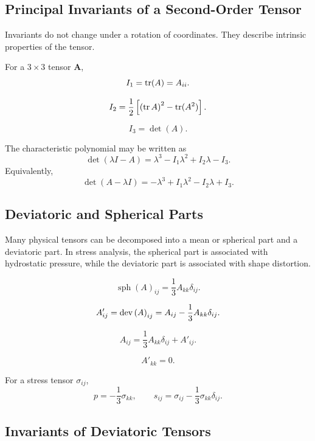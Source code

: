 \documentclass{otscience}
\begin{document}
\subsection{Principal Invariants of a Second-Order Tensor}

Invariants do not change under a rotation of coordinates. They describe intrinsic properties of the tensor.

\begin{formulaboxnosplit}
    For a \(3\times3\) tensor \(\mathbf{A}\),
    \[
        I_1=\operatorname{tr}(A)=A_{ii}.
    \]

    \[
        I_2=\frac12\left[{(\operatorname{tr} A)}^2-\operatorname{tr}(A^2)\right].
    \]

    \[
        I_3=\det(A).
    \]

    The characteristic polynomial may be written as
    \[
        \det(\lambda I-A)=\lambda^3-I_1\lambda^2+I_2\lambda-I_3.
    \]
    Equivalently,
    \[
        \det(A-\lambda I)=-\lambda^3+I_1\lambda^2-I_2\lambda+I_3.
    \]
\end{formulaboxnosplit}

\subsection{Deviatoric and Spherical Parts}

Many physical tensors can be decomposed into a mean or spherical part and a deviatoric part. In stress analysis, the spherical part is associated with hydrostatic pressure, while the deviatoric part is associated with shape distortion.

\begin{formulabox}
    \[
        \operatorname{sph}{(A)}_{ij}=\frac13A_{kk}\delta_{ij}.
    \]

    \[
        A'_{ij}=\operatorname{dev}{(A)}_{ij}=A_{ij}-\frac13A_{kk}\delta_{ij}.
    \]

    \[
        A_{ij}=\frac13A_{kk}\delta_{ij}+A'_{ij}.
    \]

    \[
        A'_{kk}=0.
    \]

    For a stress tensor \(\sigma_{ij}\),
    \[
        p=-\frac13\sigma_{kk},
        \qquad
        s_{ij}=\sigma_{ij}-\frac13\sigma_{kk}\delta_{ij}.
    \]
\end{formulabox}

\subsection{Invariants of Deviatoric Tensors}
\end{document}
